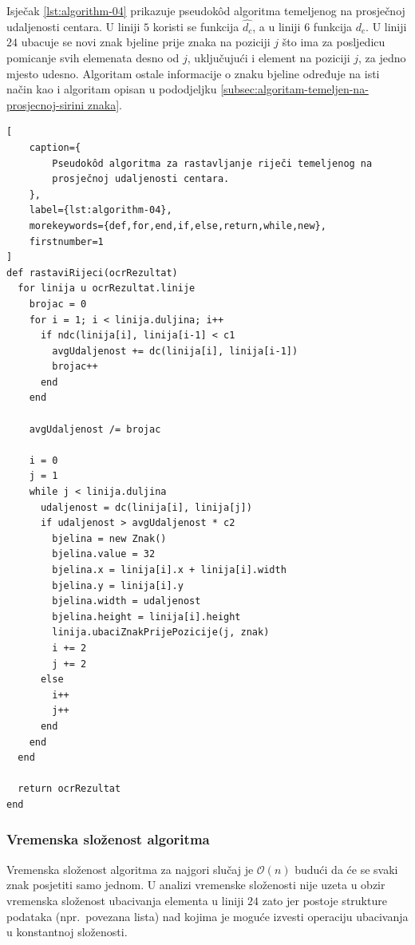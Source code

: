 \documentclass[times, utf8, zavrsni]{fer}
\begin{document}
Isječak \ref{lst:algorithm-04} prikazuje pseudokôd algoritma temeljenog na
prosječnoj udaljenosti centara. U liniji $5$ koristi se funkcija $\hat{d_c}$,
a u liniji $6$ funkcija $d_c$. U liniji $24$ ubacuje se novi znak bjeline prije
znaka na poziciji $j$ što ima za posljedicu pomicanje svih elemenata desno od
$j$, uključujući i element na poziciji $j$, za jedno mjesto udesno. Algoritam
ostale informacije o znaku bjeline određuje na isti način kao i algoritam
opisan u pododjeljku
\ref{subsec:algoritam-temeljen-na-prosjecnoj-sirini znaka}.

\pagebreak

\begin{lstlisting}[
    caption={
        Pseudokôd algoritma za rastavljanje riječi temeljenog na
        prosječnoj udaljenosti centara.
    },
    label={lst:algorithm-04},
    morekeywords={def,for,end,if,else,return,while,new},
    firstnumber=1
]
def rastaviRijeci(ocrRezultat)
  for linija u ocrRezultat.linije
    brojac = 0
    for i = 1; i < linija.duljina; i++
      if ndc(linija[i], linija[i-1] < c1
        avgUdaljenost += dc(linija[i], linija[i-1])
        brojac++
      end
    end

    avgUdaljenost /= brojac

    i = 0
    j = 1
    while j < linija.duljina
      udaljenost = dc(linija[i], linija[j])
      if udaljenost > avgUdaljenost * c2
        bjelina = new Znak()
        bjelina.value = 32
        bjelina.x = linija[i].x + linija[i].width
        bjelina.y = linija[i].y
        bjelina.width = udaljenost
        bjelina.height = linija[i].height
        linija.ubaciZnakPrijePozicije(j, znak)
        i += 2
        j += 2
      else
        i++
        j++
      end
    end
  end

  return ocrRezultat
end
\end{lstlisting}


\subsubsection{Vremenska složenost algoritma}
Vremenska složenost algoritma za najgori slučaj je $\mathcal{O}(n)$ budući
da će se svaki znak posjetiti samo jednom. U analizi vremenske složenosti
nije uzeta u obzir vremenska složenost ubacivanja elementa u liniji $24$ zato
jer postoje strukture podataka (npr.\ povezana lista) nad kojima je moguće
izvesti operaciju ubacivanja u konstantnoj složenosti.
\end{document}
